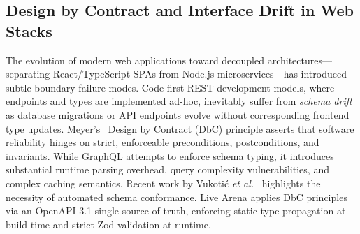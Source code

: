 \documentclass[conference]{IEEEtran}
\begin{document}
\begin{table}[t]
\caption{State-of-the-Art Comparative Analysis Across Eight Operational Capabilities}
\label{tab:sota_matrix}
\centering
{}
\end{table}

\subsection{Design by Contract and Interface Drift in Web Stacks}
The evolution of modern web applications toward decoupled architectures—separating React/TypeScript SPAs from Node.js microservices—has introduced subtle boundary failure modes. Code-first REST development models, where endpoints and types are implemented ad-hoc, inevitably suffer from \textit{schema drift} as database migrations or API endpoints evolve without corresponding frontend type updates. Meyer's~\cite{meyer1992applying} Design by Contract (DbC) principle asserts that software reliability hinges on strict, enforceable preconditions, postconditions, and invariants. While GraphQL attempts to enforce schema typing, it introduces substantial runtime parsing overhead, query complexity vulnerabilities, and complex caching semantics. Recent work by Vukoti\'{c} \textit{et al.}~\cite{vukotic2023contract} highlights the necessity of automated schema conformance. Live Arena applies DbC principles via an OpenAPI 3.1 single source of truth, enforcing static type propagation at build time and strict Zod validation at runtime.
\end{document}
